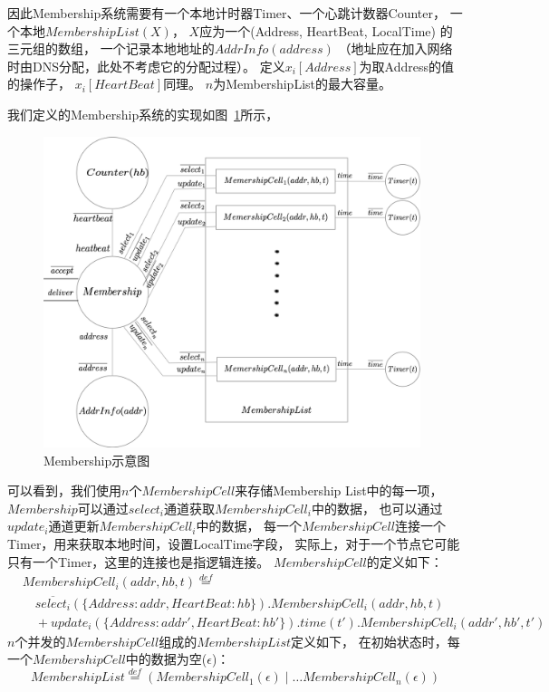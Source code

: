 因此Membership系统需要有一个本地计时器Timer、一个心跳计数器Counter，
一个本地$MembershipList(X)$，
$X$应为一个(Address, HeartBeat, LocalTime)
的三元组的数组，
一个记录本地地址的$AddrInfo(address)$
（地址应在加入网络时由DNS分配，此处不考虑它的分配过程）。
定义$x_i[Address]$为取Address的值的操作子，
$x_i[HeartBeat]$同理。
$n$为MembershipList的最大容量。

我们定义的Membership系统的实现如图~\ref{fig:membership_system}所示，
\begin{figure}[!htbp]
	\small
   \centering
	\includegraphics[width=11cm]{../figures/membership.png}
    \caption{Membership示意图}
    \label{fig:membership_system}
\end{figure}
可以看到，我们使用$n$个$MembershipCell$来存储Membership List中的每一项，
$Membership$可以通过$select_i$通道获取$MembershipCell_i$中的数据，
也可以通过$update_i$通道更新$MembershipCell_i$中的数据，
每一个$MembershipCell$连接一个Timer，用来获取本地时间，设置LocalTime字段，
实际上，对于一个节点它可能只有一个Timer，这里的连接也是指逻辑连接。
$MembershipCell$的定义如下：
\begin{equation}
   \begin{split}
      &MembershipCell_i(addr,hb,t)\stackrel{def}{=}\\
   &\quad\overline{select_i}(\{Address:addr,HeartBeat:hb\}).MembershipCell_i(addr,hb,t)\\
   &\quad+update_i(\{Address:addr',HeartBeat:hb'\}).time(t').MembershipCell_i(addr',hb',t')
   \end{split}
\end{equation}
$n$个并发的$MembershipCell$组成的$MembershipList$定义如下，
在初始状态时，每一个$MembershipCell$中的数据为空($\epsilon$)：
\begin{equation}
   MembershipList\stackrel{def}{=}(MembershipCell_1(\epsilon)\mid \dots MembershipCell_n(\epsilon))
\end{equation}

